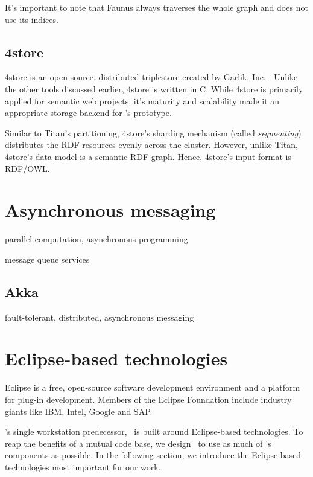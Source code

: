 It's important to note that Faunus always traverses the whole graph and does not use its indices.

\subsection{4store}

4store is an open-source, distributed triplestore created by Garlik, Inc. \cite{4store}. Unlike the other tools discussed earlier, 4store is written in C. While 4store is primarily applied for semantic web projects, it's maturity and scalability made it an appropriate storage backend for \iqd's prototype.

Similar to Titan's partitioning, 4store's sharding mechanism (called \emph{segmenting}) distributes the RDF resources evenly across the cluster. However, unlike Titan, 4store's data model is a semantic RDF graph. Hence, 4store's input format is RDF/OWL.  


\section{Asynchronous messaging}

parallel computation, asynchronous programming 

message queue services

\subsection{Akka}

fault-tolerant, distributed, asynchronous messaging




\section{Eclipse-based technologies}

Eclipse is a free, open-source software development environment and a platform for plug-in development. Members of the Eclipse Foundation include industry giants like IBM, Intel, Google and SAP.

\iqd's single workstation predecessor, \eiq\ is built around Eclipse-based technologies. To reap the benefits of a mutual code base, we design \iqd\ to use as much of \eiq's components as possible. In the following section, we introduce the Eclipse-based technologies most important for our work.  

